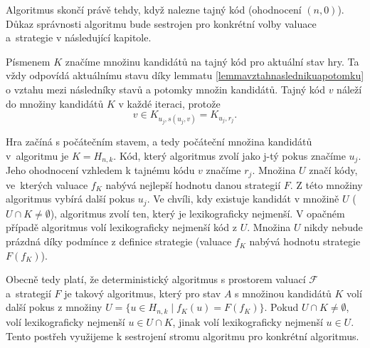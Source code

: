 \begin{pozn}
    Algoritmus skončí právě tehdy, když nalezne tajný kód (ohodnocení $(n,0)$). Důkaz správnosti algoritmu bude sestrojen pro konkrétní volby valuace a~strategie v následující kapitole. 
\end{pozn}











Písmenem $K$ značíme množinu kandidátů na tajný kód pro aktuální stav hry. Ta vždy odpovídá aktuálnímu stavu díky lemmatu \ref{lemmavztahnaslednikuapotomku} o vztahu mezi následníky stavů a potomky množin kandidátů. Tajný kód $v$ náleží do množiny kandidátů $K$ v každé iteraci, protože 
\[v \in K_{u_j, s(u_j,v)} = K_{u_j, r_j}.\]

Hra začíná s počátečním stavem, a tedy počáteční množina kandidátů v~algoritmu je $K = H_{n,k}$. Kód, který algoritmus zvolí jako j-tý pokus značíme $u_j$. Jeho ohodnocení vzhledem k tajnému kódu $v$ značíme $r_j$. Množina $U$ značí kódy, ve~kterých valuace $f_K$ nabývá nejlepší hodnotu danou strategií $F$. Z této množiny algoritmus vybírá další pokus $u_j$. Ve chvíli, kdy existuje kandidát v množině $U$ ($U\cap K \neq \emptyset$), algoritmus zvolí ten, který je lexikograficky nejmenší. V opačném případě algoritmus volí lexikograficky nejmenší kód z $U$. Množina $U$ nikdy nebude prázdná díky podmínce z definice strategie (valuace $f_K$ nabývá hodnotu strategie $F(f_K)$). 

Obecně tedy platí, že deterministický algoritmus s prostorem valuací $\mathcal{F}$ a~strategií $F$ je takový algoritmus, který pro stav $A$ s množinou kandidátů $K$ volí další pokus z množiny $U = \{u \in H_{n,k} \mid f_K(u) = F(f_K)\}$. Pokud $U \cap K \neq \emptyset$, volí lexikograficky nejmenší $u \in U \cap K$, jinak volí lexikograficky nejmenší $u \in U$. Tento postřeh využijeme k sestrojení stromu algoritmu pro konkrétní algoritmus.


